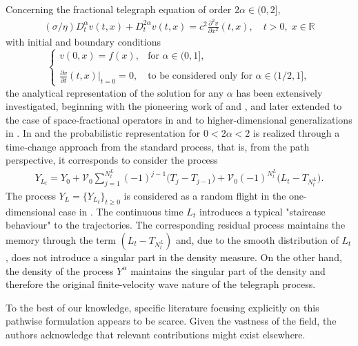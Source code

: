\documentclass[10pt,a4paper]{article}
\numberwithin{equation}{section}
\theoremstyle{plain}
\theoremstyle{remark}
\begin{document}
Concerning the fractional telegraph equation of order $2\alpha \in (0,2]$, 
\begin{align*}
(\sigma/\eta) D^\alpha_t v(t,x) + D^{2\alpha}_t v(t,x) = c^2 \frac{\partial^2 v}{\partial x^2} (t,x), \quad t>0,\; x \in \mathbb{R}
\end{align*}
with initial and boundary conditions
\begin{equation*}
\left\lbrace
\begin{array}{ll}
\displaystyle v(0,x) = f(x), & \textrm{for $\alpha \in (0,1]$},\\
\\
\displaystyle \frac{\partial v}{\partial t}(t, x) \bigg|_{t=0} = 0, &  \textrm{to be considered only for $\alpha \in (1/2, 1]$},
\end{array}
\right .
\end{equation*}
the analytical representation of the solution for any $\alpha$ has been extensively investigated, beginning with the pioneering work of \cite{CASCAVAL2002145} and \cite{OrsBeg}, and later extended to the case of space-fractional operators in \cite{OrsZhao} and to higher-dimensional generalizations in \cite{OrsDeG}. In \cite{CASCAVAL2002145} and \cite{OrsBeg} the probabilistic representation for $0 < 2\alpha < 2$ is realized through a time-change approach from the standard process, that is, from the path perspective, it corresponds to consider the process
\begin{align*}
Y_{L_t} = Y_0 + \mathcal{V}_0 \sum_{j=1}^{N^L_t} (-1)^{j-1} \big(T_j - T_{j-1} \big) + \mathcal{V}_0 (-1)^{N^L_t} \big( L_t - T_{N^L_t}\big).
\end{align*}
The process $Y_{L} = \{Y_{L_t}\}_{t\geq 0}$ is considered as a random flight in the one-dimensional case in \cite[see formula (4.9)]{AngDeGGarIaf}. The continuous time $L_{t}$ introduces a typical "staircase behaviour" to the trajectories. The corresponding residual process maintains the memory through the term $(L_t - T_{N^L_t})$ and, due to the smooth distribution of $L_{t}$, does not introduce a singular part in the density measure. On the other hand, the density of the process $Y^\alpha$ maintains the singular part of the density and therefore the original finite-velocity wave nature of the telegraph process. 

To the best of our knowledge, specific literature focusing explicitly on this pathwise formulation appears to be scarce. Given the vastness of the field, the authors acknowledge that relevant contributions might exist elsewhere.\\
\end{document}
